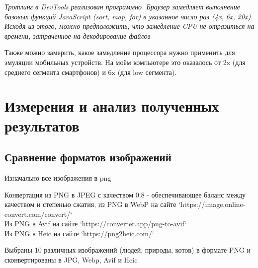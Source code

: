 \documentclass[12pt]{article}
\begin{document}
\textit{Тротлинг в DevTools реализован программно.
    Браузер замедляет выполнение базовых функций JavaScript (sort, map, for) в указанное число раз (4x, 6x, 20x).
    Исходя из этого, можно предположить, что замедление CPU не отразиться на времени,
    затраченное на декодирование файлов}

Также можно замерить, какое замедление процессора нужно применить для эмуляции мобильных устройств. На моём компьютере это оказалось от 2x (для среднего сегмента смартфонов) и 6x (для low сегмента).

\section{Измерения и анализ полученных результатов}

\subsection{Сравнение форматов изображений}

Изначально все изображения в png

Конвертация из PNG в JPEG с качеством 0.8 - обеспечивающее баланс между качеством
и степенью сжатия, из PNG в WebP на сайте `https://image.online-convert.com/convert/`\\
Из PNG в Avif на сайте `https://converter.app/png-to-avif`\\
Из PNG в Heic на сайте `https://png2heic.com/`

Выбраны 10 различных изображений (людей, природы, котов)
в формате PNG и сконвертированы в JPG, Webp, Avif и Heic
\end{document}
